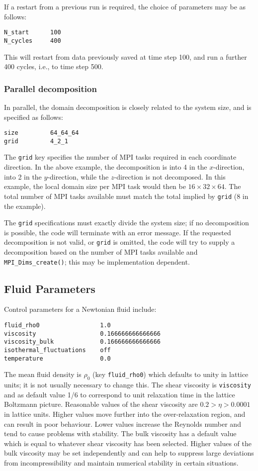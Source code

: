 If a restart from a previous run is required, the choice of parameters
may be as follows:
\begin{lstlisting}
N_start      100
N_cycles     400
\end{lstlisting}
This will restart from data previously saved at time step 100, and
run a further 400 cycles, i.e., to time step 500.

\subsubsection{Parallel decomposition}

In parallel, the domain decomposition is closely related to the
system size, and is specified as follows:
\begin{lstlisting}
size         64_64_64
grid         4_2_1
\end{lstlisting}
The \texttt{grid} key specifies the number of MPI tasks required in
each coordinate direction. In the above example, the decomposition
is into 4 in the $x$-direction, into 2 in the $y$-direction, while
the $z$-direction is not decomposed. In this example, the local domain
size per MPI
task would then be $16\times32\times64$. The total number of MPI tasks
available must match the total implied by \texttt{grid} (8 in the
example).

The \texttt{grid} specifications must exactly divide the system size;
if no decomposition is possible, the code will terminate with an error
message.
If the requested decomposition is not valid, or \texttt{grid} is
omitted, the code will try to supply a decomposition based on
the number of MPI tasks available and \texttt{MPI\_Dims\_create()};
this may be implementation dependent.


\subsection{Fluid Parameters}
\label{input-fluid-parameters}

Control parameters for a Newtonian fluid include:
\begin{lstlisting}
fluid_rho0                 1.0
viscosity                  0.166666666666666
viscosity_bulk             0.166666666666666
isothermal_fluctuations    off
temperature                0.0
\end{lstlisting}
The mean fluid density is $\rho_0$ (key \texttt{fluid\_rho0}) which
defaults to unity in lattice units; it is not usually necessary to
change this. The shear viscosity is
\texttt{viscosity} and as default value 1/6 to correspond to
unit relaxation time in the lattice Boltzmann picture. Reasonable
values of the shear viscosity are $0.2 > \eta > 0.0001$ in lattice
units. Higher values move further into the over-relaxation region, and can
result in poor behaviour. Lower
values increase the Reynolds number and tend to cause
problems with stability. The bulk
viscosity has a default value which is equal to whatever shear
viscosity has been selected. Higher values of the bulk viscosity
may be set independently and can help to suppress large deviations
from incompressibility and maintain numerical stability
in certain situations.

